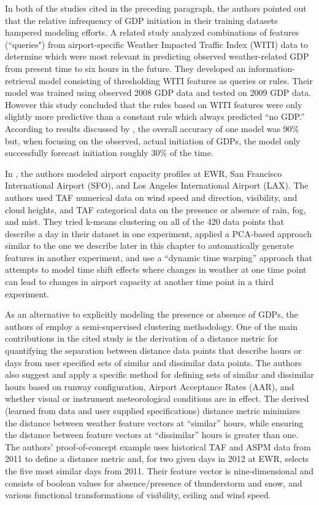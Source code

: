 \documentclass[11pt]{scrartcl}
\begin{document}
In both of the studies cited in the preceding paragraph, the authors pointed out that the relative infrequency of GDP initiation in their training datasets hampered modeling efforts.  A related study \cite{wolfe2011method} analyzed combinations of features (``queries") from airport-specific Weather Impacted Traffic Index (WITI) data to determine which were most relevant in predicting observed weather-related GDP from present time to six hours in the future.  They developed an information-retrieval model consisting of thresholding WITI features as queries or rules.  Their model was trained using observed 2008 GDP data and tested on 2009 GDP data.  However this study concluded that the rules based on WITI features were only slightly more predictive than a constant rule which always predicted ``no GDP.''   According to results discussed by \cite{Hansen_informs}, the overall accuracy of one model was 90\% but, when focusing on the observed, actual initiation of GDPs, the model only successfully forecast initiation roughly 30\% of the time.

In \cite{buxi2011generating}, the authors modeled airport capacity profiles at EWR, San Francisco International Airport (SFO), and Los Angeles International Airport (LAX).  The authors used TAF numerical data on wind speed and direction, visibility, and cloud heights, and TAF categorical data on the presence or absence of rain, fog, and mist.  They tried k-means clustering on all of the 420 data points that describe a day in their dataset in one experiment, applied a PCA-based approach similar to the one we describe later in this chapter to automatically generate features in another experiment, and use a ``dynamic time warping'' approach that attempts to model time shift effects where changes in weather at one time point can lead to changes in airport capacity at another time point in a third experiment.

As an alternative to explicitly modeling the presence or absence of GDPs, the authors of \cite{liu2014} employ a semi-supervised clustering methodology.  One of the main contributions in the cited study is the derivation of a distance metric for quantifying the separation between distance data points that describe hours or days from user specified sets of similar and dissimilar data points.  The authors also suggest and apply a specific method for defining sets of similar and dissimilar hours based on runway configuration, Airport Acceptance Rates (AAR), and whether visual or instrument meteorological conditions are in effect.  The derived (learned from data and user supplied specifications) distance metric minimizes the distance between weather feature vectors at ``similar'' hours, while ensuring the distance between feature vectors at ``dissimilar'' hours is greater than one. The authors' proof-of-concept example uses historical TAF and ASPM data from 2011 to define a distance metric and, for two given days in 2012 at EWR, selects the five most similar days from 2011.  Their feature vector is nine-dimensional and consists of boolean values for absence/presence of thunderstorm and snow, and various functional transformations of visibility, ceiling and wind speed.
\end{document}
